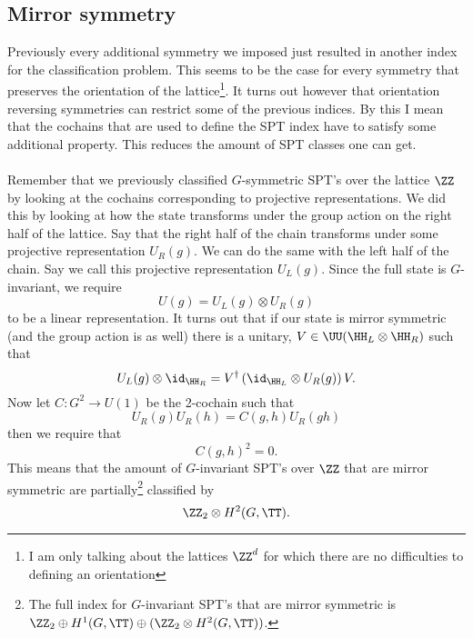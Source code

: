 \subsection{Mirror symmetry}
Previously every additional symmetry we imposed just resulted in another index for the classification problem. This seems to be the case for every symmetry that preserves the orientation of the lattice\footnote{I am only talking about the lattices $\ZZ^d$ for which there are no difficulties to defining an orientation}. It turns out however that orientation reversing symmetries can restrict some of the previous indices. By this I mean that the cochains that are used to define the SPT index have to satisfy some additional property. This reduces the amount of SPT classes one can get.\\\\
Remember that we previously classified $G$-symmetric SPT's over the lattice $\ZZ$ by looking at the cochains corresponding to projective representations. We did this by looking at how the state transforms under the group action on the right half of the lattice. Say that the right half of the chain transforms under some projective representation $U_R(g)$. We can do the same with the left half of the chain. Say we call this projective representation $U_L(g)$. Since the full state is $G$-invariant, we require
\begin{equation}
U(g)=U_L(g)\otimes U_R(g)
\end{equation}
to be a linear representation. It turns out that if our state is mirror symmetric (and the group action is as well) there is a unitary, $V\in\UU(\HH_L\otimes\HH_R)$ such that
\begin{equation}
U_L(g)\otimes\id_{\HH_R}=V^\dagger \left(\id_{\HH_L}\otimes U_R(g)\right)V.
\end{equation}
Now let $C:G^2\rightarrow U(1)$ be the 2-cochain such that
\begin{equation}
U_R(g)U_R(h)=C(g,h)U_R(gh)
\end{equation}
then we require that
\begin{equation}
C(g,h)^2=0.
\end{equation}
This means that the amount of $G$-invariant SPT's over $\ZZ$ that are mirror symmetric are partially\footnote{The full index for $G$-invariant SPT's that are mirror symmetric is $\ZZ_2\oplus H^1(G,\TT)\oplus (\ZZ_2\otimes H^2(G,\TT))$.} classified by
\begin{equation}
\ZZ_2\otimes H^2(G,\TT).
\end{equation}



\cleardoublepage

